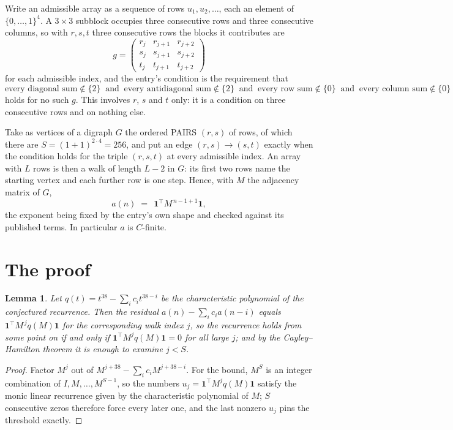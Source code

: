 \documentclass[11pt,a4paper]{article}
\theoremstyle{plain}
\newtheorem{lemma}[theorem]{Lemma}
\theoremstyle{definition}
\begin{document}
Write an admissible array as a sequence of rows $u_1,u_2,\dots$, each an element of
$\{0,\dots,1\}^{4}$. A $3\times3$ subblock occupies three consecutive rows and
three consecutive columns, so with $r,s,t$ three consecutive rows the blocks it
contributes are
\[
g=\begin{pmatrix}r_j&r_{j+1}&r_{j+2}\\ s_j&s_{j+1}&s_{j+2}\\ t_j&t_{j+1}&t_{j+2}\end{pmatrix}
\]
for each admissible index, and the entry's condition is the requirement that
\[
\text{every diagonal sum} \notin \{2\}\ \text{ and }\ \text{every antidiagonal sum} \notin \{2\}\ \text{ and }\ \text{every row sum} \notin \{0\}\ \text{ and }\ \text{every column sum} \notin \{0\}
\]
holds for no such $g$. This involves $r$, $s$ and $t$ only: it is a condition on
three consecutive rows and on nothing else.

Take as vertices of a digraph $G$ the ordered PAIRS $(r,s)$ of rows, of which there are
$S=(1+1)^{2\cdot4}=256$, and put an edge $(r,s)\to(s,t)$ exactly when the condition
holds for the triple $(r,s,t)$ at every admissible index. An array with $L$ rows is then a
walk of length $L-2$ in $G$: its first two rows name the starting vertex and each further
row is one step. Hence, with $M$ the adjacency matrix of $G$,
\[
a(n)\;=\;\,\mathbf{1}^{\!\top}M^{\,n-1+1}\mathbf{1},
\]
the exponent being fixed by the entry's own shape and checked against its published terms.
In particular $a$ is $C$-finite.

\section{The proof}

\begin{lemma}\label{lem:crit}
Let $q(t)=t^{38}-\sum_i c_it^{38-i}$ be the characteristic polynomial of the
conjectured recurrence. Then the residual $a(n)-\sum_ic_ia(n-i)$ equals
$\mathbf{1}^{\!\top}M^{\,j}q(M)\mathbf{1}$ for the corresponding walk index
$j$, so the recurrence holds from some point on if and only if
$\mathbf{1}^{\!\top}M^{j}q(M)\mathbf{1}=0$ for all large $j$; and by the
Cayley--Hamilton theorem it is enough to examine $j<S$.
\end{lemma}

\begin{proof}
Factor $M^{j}$ out of $M^{j+38}-\sum_ic_iM^{j+38-i}$. For the bound, $M^{S}$
is an integer combination of $I,M,\dots,M^{S-1}$, so the numbers
$u_j=\mathbf{1}^{\!\top}M^{j}q(M)\mathbf{1}$ satisfy the monic linear recurrence given by
the characteristic polynomial of $M$; $S$ consecutive zeros therefore force every later one,
and the last nonzero $u_j$ pins the threshold exactly.
\end{proof}
\end{document}
